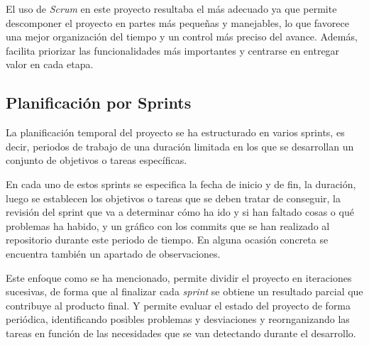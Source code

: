 El uso de \textit{Scrum} en este proyecto resultaba el más adecuado ya que permite descomponer el proyecto en partes más pequeñas y manejables, lo que favorece una mejor organización del tiempo y un control más preciso del avance. Además, facilita priorizar las funcionalidades más importantes y centrarse en entregar valor en cada etapa.

\subsection{Planificación por Sprints}

La planificación temporal del proyecto se ha estructurado en varios sprints, es decir, periodos de trabajo de una duración limitada en los que se desarrollan un conjunto de objetivos o tareas específicas.

En cada uno de estos sprints se especifica la fecha de inicio y de fin, la duración, luego se establecen los objetivos o tareas que se deben tratar de conseguir, la revisión del sprint que va a determinar cómo ha ido y si han faltado cosas o qué problemas ha habido, y un gráfico con los commits que se han realizado al repositorio durante este periodo de tiempo. En alguna ocasión concreta se encuentra también un apartado de observaciones.

Este enfoque como se ha mencionado, permite dividir el proyecto en iteraciones sucesivas, de forma que al finalizar cada \textit{sprint} se obtiene un resultado parcial que contribuye al producto final. Y permite evaluar el estado del proyecto de forma periódica, identificando posibles problemas y desviaciones y reornganizando las tareas en función de las necesidades que se van detectando durante el desarrollo.

